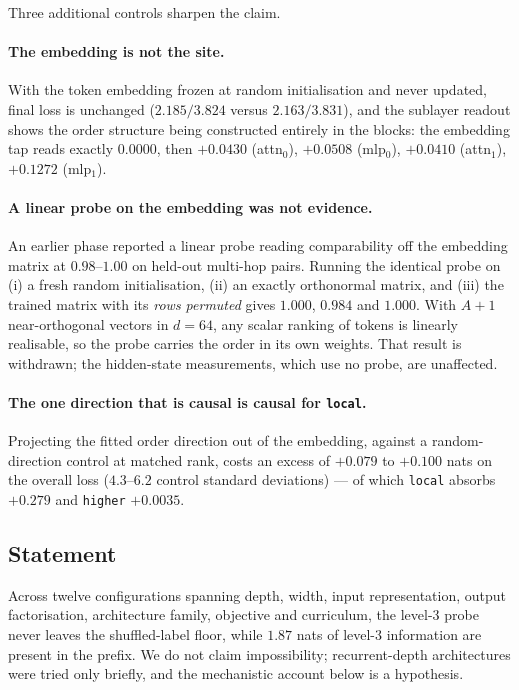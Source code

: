 \documentclass[11pt,a4paper]{article}
\theoremstyle{plain}
\theoremstyle{definition}
\begin{document}
Three additional controls sharpen the claim.

\paragraph{The embedding is not the site.}
With the token embedding frozen at random initialisation and never updated,
final loss is unchanged ($2.185/3.824$ versus $2.163/3.831$), and the
sublayer readout shows the order structure being constructed entirely in the
blocks: the embedding tap reads exactly $0.0000$, then $+0.0430$ (attn$_0$),
$+0.0508$ (mlp$_0$), $+0.0410$ (attn$_1$), $+0.1272$ (mlp$_1$).

\paragraph{A linear probe on the embedding was not evidence.}
An earlier phase reported a linear probe reading comparability off the
embedding matrix at $0.98$--$1.00$ on held-out multi-hop pairs. Running the
identical probe on (i) a fresh random initialisation, (ii) an exactly
orthonormal matrix, and (iii) the trained matrix with its \emph{rows permuted}
gives $1.000$, $0.984$ and $1.000$. With $A+1$ near-orthogonal vectors in
$d=64$, any scalar ranking of tokens is linearly realisable, so the probe
carries the order in its own weights. That result is withdrawn; the
hidden-state measurements, which use no probe, are unaffected.

\paragraph{The one direction that is causal is causal for \texttt{local}.}
Projecting the fitted order direction out of the embedding, against a
random-direction control at matched rank, costs an excess of
$+0.079$ to $+0.100$ nats on the overall loss ($4.3$--$6.2$ control standard
deviations) --- of which \texttt{local} absorbs $+0.279$ and \texttt{higher}
$+0.0035$.

\subsection{Statement}

Across twelve configurations spanning depth, width, input representation,
output factorisation, architecture family, objective and curriculum, the
level-3 probe never leaves the shuffled-label floor, while $1.87$ nats of
level-3 information are present in the prefix. We do not claim impossibility;
recurrent-depth architectures were tried only briefly, and the mechanistic
account below is a hypothesis.
\end{document}
